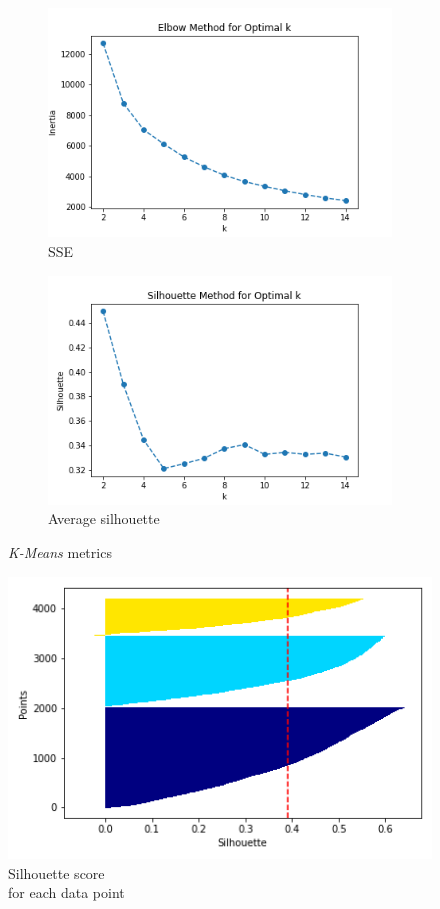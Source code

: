 \begin{figure}[h!]
     \captionsetup{justification=centering}		
     \centering
     \begin{subfigure}{0.49\textwidth}
         \centering
	 \captionsetup{type=figure}
         \includegraphics[width=\textwidth]{img/clustering/sse.png}
         \caption{SSE}
         \label{fig:sse}
     \end{subfigure}
     \begin{subfigure}{0.49\textwidth}
         \centering
         \includegraphics[width=\textwidth]{img/clustering/sil.png}
         \caption{Average silhouette}
         \label{fig:sil}
     \end{subfigure}
     \caption{\emph{K-Means} metrics}
    \label{fig:km_metrics}
\end{figure}

\begin{figure}
    \vspace{-5mm}
    \centering
    \captionsetup{justification=centering}
    \includegraphics[width=.3\textwidth]{img/clustering/sil_tot.png}
    \caption{Silhouette score\\ for each data point}
    \label{fig:silhouette}
\end{figure}

